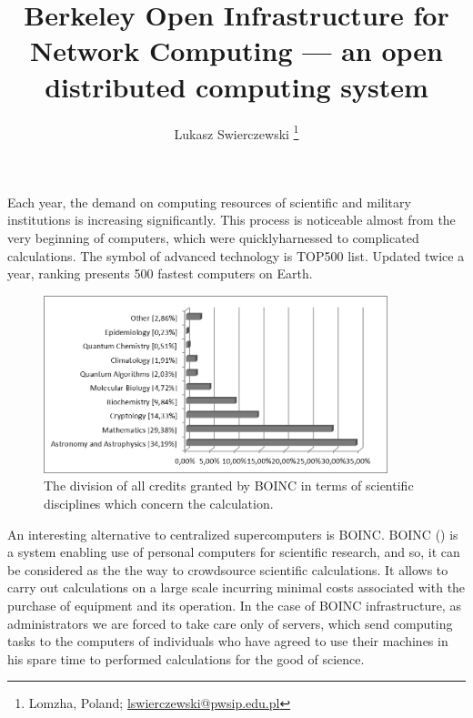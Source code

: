 \documentclass[10pt, a5paper]{article}
\begin{document}
\title{Berkeley Open Infrastructure for Network Computing — an open distributed computing system}
\author{Lukasz Swierczewski \footnote{Lomzha, Poland; \url{lswierczewski@pwsip.edu.pl}}}
\maketitle
Each year, the demand on computing resources of scientific and military institutions is increasing significantly. This process is noticeable almost from the very beginning of computers, which were quickly\linebreak harnessed to complicated calculations. The symbol of advanced \linebreak technology is TOP500 list. Updated twice a year, ranking presents 500 fastest computers on Earth.

\begin{figure}[h!]
  \centering
  \includegraphics[width=10cm]{104_2013_w_Swierczewski_boinc_1}
  \caption{The division of all credits granted by BOINC in terms of scientific disciplines which concern the calculation.}\label{fig:swier1}
\end{figure}

An interesting alternative to centralized supercomputers is BOINC. BOINC (\cite{swier1}) is a system enabling use of personal computers for scientific research, and so, it can be considered as the the way to crowdsource scientific calculations. It allows to carry out calculations on a large scale incurring minimal costs associated with the purchase of equipment and its operation. In the case of BOINC infrastructure, as administrators we are forced to take care only of servers, which send computing tasks to the computers of individuals who have agreed to use their machines in his spare time to performed calculations for the good of science.
\end{document}
